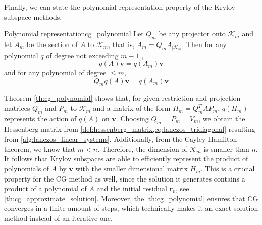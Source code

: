 Finally, we can state the polynomial representation property of the Krylov subspace methods.
\begin{fancyth}{Polynomial representation}{cg_polynomial}
  Let $Q_m$ be any projector onto $\mathcal{K}_m$ and let $A_m$ be the section of $A$ to $\mathcal{K}_m$, that is, $A_m=Q_m A_{\left.\right|\mathcal{K}_m}$. Then for any polynomial $q$ of degree not exceeding $m-1$ \cite[proposition 6.3]{iter_method_saad},
  \begin{equation*}
    q(A) \mathbf{v}=q\left(A_m\right) \mathbf{v}
  \end{equation*}
  and for any polynomial of degree $\leq m$,
  \begin{equation*}
    Q_m q(A) \mathbf{v}=q\left(A_m\right) \mathbf{v}
  \end{equation*}
\end{fancyth}

Theorem \ref{th:cg_polynomial} shows that, for given restriction and projection matrices $Q_m$ and $P_m$ to $\mathcal{K}_m$ and a matrix of the form $H_m = Q_m^T A P_m$, $q(H_m)$ represents the action of $q(A)$ on $\mathbf{v}$. Choosing $Q_m=P_m=V_m$, we obtain the Hessenberg matrix from \cref{def:hessenberg_matrix,eq:lanczos_tridiagonal} resulting from \cref{alg:lanczos_linear_systems}. Additionally, from the Cayley-Hamilton theorem, we know that $m<n$. Therefore, the dimension of $\mathcal{K}_m$ is smaller than $n$. It follows that Krylov subspaces are able to efficiently represent the product of polynomials of $A$ by $\mathbf{v}$ with the smaller dimensional matrix $H_m$. This is a crucial property for the CG method as well, since the solution it generates contains a product of a polynomial of $A$ and the initial residual $\mathbf{r}_0$, see \cref{th:cg_approximate_solution}. Moreover, the \cref{th:cg_polynomial} ensures that CG converges in a finite amount of steps, which technically makes it an exact solution method instead of an iterative one.

